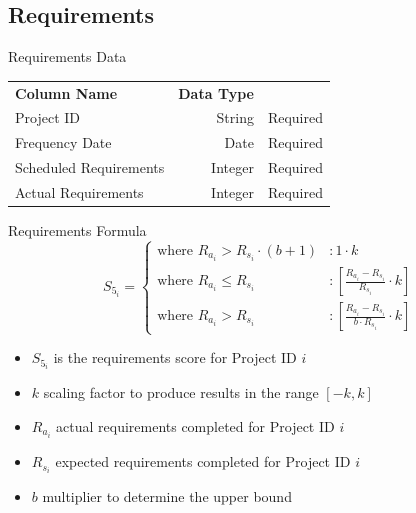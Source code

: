     \subsection{Requirements}
        \begin{frame}{Requirements Data}
            \centering
            \begin{tabular}{l | r | r}
                {\bfseries Column Name}
                 & {\bfseries Data Type}
                 &  \\
                
                Project ID & String  & Required \\
                \myrowcolour%
                Frequency Date & Date & Required \\
                Scheduled Requirements & Integer & Required \\
                \myrowcolour%
                Actual Requirements & Integer  & Required \\
            \end{tabular}
        \end{frame} 
        \begin{frame}{Requirements Formula }
        \begin{displaymath}
            S_{5_i} = \left\{
             \begin{array}{lr}
               \text{where } R_{a_i} > R_{s_i} \cdot (b + 1) & :  1 \cdot k \\
               \text{where } R_{a_i} \leq R_{s_i} & : \left[ \frac{R_{a_i} - R_{s_i}}{R_{s_i}}\cdot k \right] \\
               \text{where } R_{a_i} > R_{s_i}  & : \left[ \frac{R_{a_i} - R_{s_i} }{b \cdot R_{s_i}}\cdot k \right]
             \end{array}
            \right. 
            \end{displaymath}
            
            \begin{itemize}
                \item $S_{5_i}$ is the requirements score for Project ID $i$
                \item $k$ scaling factor to produce results in the range $[-k,k]$
                \item $R_{a_i}$ actual requirements completed for Project ID $i$
                \item $R_{s_i}$ expected requirements completed for Project ID $i$
                \item $b$ multiplier to determine the upper bound
            \end{itemize}
        \end{frame} 
